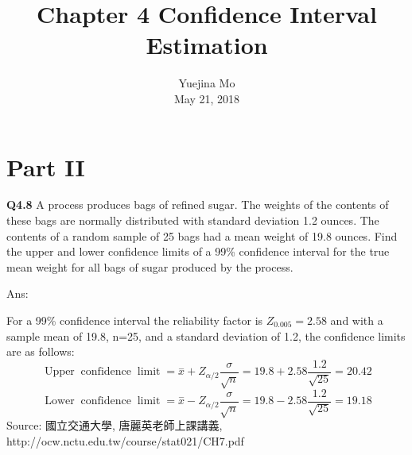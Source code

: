 \documentclass{article}
\newcommand{\tmaffiliation}[1]{\\ #1}
\newcommand{\tmop}[1]{\ensuremath{\operatorname{#1}}}
\newcommand{\tmtextbf}[1]{{\bfseries{#1}}}
\begin{document}
\title{Chapter 4 Confidence Interval Estimation}

\author{
  Yuejina Mo
  \tmaffiliation{May 21, 2018}
}

\maketitle

\section*{Part II}

\tmtextbf{Q4.8} A process produces bags of refined sugar. The weights of the
contents of these bags are normally distributed with standard deviation 1.2
ounces. The contents of a random sample of 25 bags had a mean weight of 19.8
ounces. Find the upper and lower confidence limits of a 99\% confidence
interval for the true mean weight for all bags of sugar produced by the
process.

Ans:

For a 99\% confidence interval the reliability factor is $Z_{0.005} = 2.58$
and with a sample mean of 19.8, n=25, and a standard deviation of 1.2, the
confidence limits are as follows:
\[ \tmop{Upper} \tmop{confidence} \tmop{limit} = \overset{-}{x} + Z_{\alpha /
   2} \frac{\sigma}{\sqrt{n}} = 19.8 + 2.58 \frac{1.2}{\sqrt{25}} = 20.42 \]
\[ \tmop{Lower} \tmop{confidence} \tmop{limit} = \overset{-}{x} - Z_{\alpha /
   2} \frac{\sigma}{\sqrt{n}} = 19.8 - 2.58 \frac{1.2}{\sqrt{25}} = 19.18 \]
Source: 國立交通大學, 唐麗英老師上課講義,
http://ocw.nctu.edu.tw/course/stat021/CH7.pdf
\end{document}
